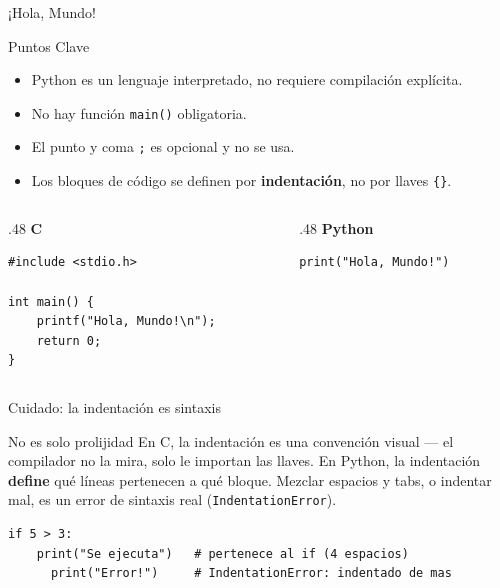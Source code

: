 \documentclass{beamer}
\begin{document}
\begin{frame}[fragile]{¡Hola, Mundo!}
  \begin{block}{Puntos Clave}
    \begin{itemize}
      \item Python es un lenguaje interpretado, no requiere compilación explícita.
      \item No hay función \texttt{main()} obligatoria.
      \item El punto y coma \texttt{;} es opcional y no se usa.
      \item Los bloques de código se definen por \textbf{indentación}, no por llaves \texttt{\{\}}.
    \end{itemize}
  \end{block}

  \begin{columns}[T]
    \begin{column}{.48\textwidth}
      \centering\textbf{C}
      \begin{verbatim}
#include <stdio.h>

int main() {
    printf("Hola, Mundo!\n");
    return 0;
}
      \end{verbatim}
    \end{column}
    \begin{column}{.48\textwidth}
      \centering\textbf{Python}
      \begin{verbatim}
print("Hola, Mundo!")
      \end{verbatim}
    \end{column}
  \end{columns}
\end{frame}

\begin{frame}[fragile]{Cuidado: la indentación es sintaxis}
  \begin{alertblock}{No es solo prolijidad}
    En C, la indentación es una convención visual — el compilador no la
    mira, solo le importan las llaves. En Python, la indentación
    \textbf{define} qué líneas pertenecen a qué bloque. Mezclar espacios y
    tabs, o indentar mal, es un error de sintaxis real (\texttt{IndentationError}).
  \end{alertblock}
  \begin{verbatim}
if 5 > 3:
    print("Se ejecuta")   # pertenece al if (4 espacios)
      print("Error!")     # IndentationError: indentado de mas
  \end{verbatim}
\end{frame}
\end{document}
